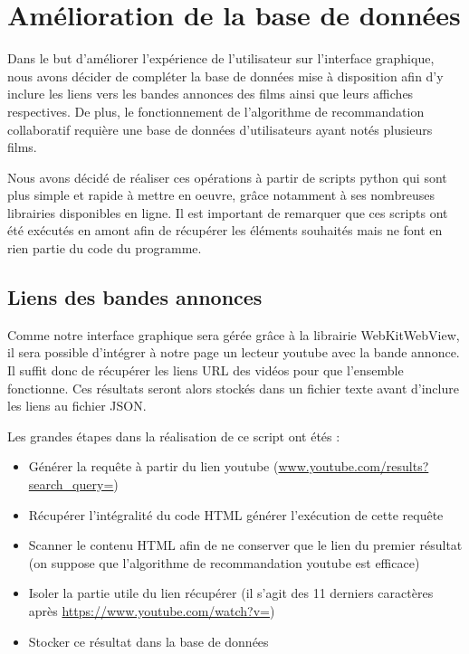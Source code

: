 \section{Amélioration de la base de données}
Dans le but d'améliorer l'expérience de l'utilisateur sur l'interface graphique, nous avons décider de compléter la base de données mise à disposition afin d'y inclure les liens vers les bandes annonces des films ainsi que leurs affiches respectives.
De plus, le fonctionnement de l'algorithme de recommandation collaboratif requière une base de données d'utilisateurs ayant notés plusieurs films.
\par Nous avons décidé de réaliser ces opérations à partir de scripts python qui sont plus simple et rapide à mettre en oeuvre, grâce notamment à ses nombreuses librairies disponibles en ligne. Il est important de remarquer que ces scripts ont été exécutés en amont afin de récupérer les éléments souhaités mais ne font en rien partie du code du programme.

\subsection{Liens des bandes annonces}
Comme notre interface graphique sera gérée grâce à la librairie WebKitWebView, il sera possible d'intégrer à notre page un lecteur youtube avec la bande annonce.
Il suffit donc de récupérer les liens URL des vidéos pour que l'ensemble fonctionne. Ces résultats seront alors stockés dans un fichier texte avant d'inclure les liens au fichier JSON.\par
Les grandes étapes dans la réalisation de ce script ont étés :
\begin{itemize}
	\item Générer la requête à partir du lien youtube (\url{www.youtube.com/results?search\_query=})
	\item Récupérer l'intégralité du code HTML générer l'exécution de cette requête
	\item Scanner le contenu HTML afin de ne conserver que le lien du premier résultat (on suppose que l'algorithme de recommandation youtube est efficace)
	\item Isoler la partie utile du lien récupérer (il s'agit des 11 derniers caractères après \url{https://www.youtube.com/watch?v=})
	\item Stocker ce résultat dans la base de données
\end{itemize}

